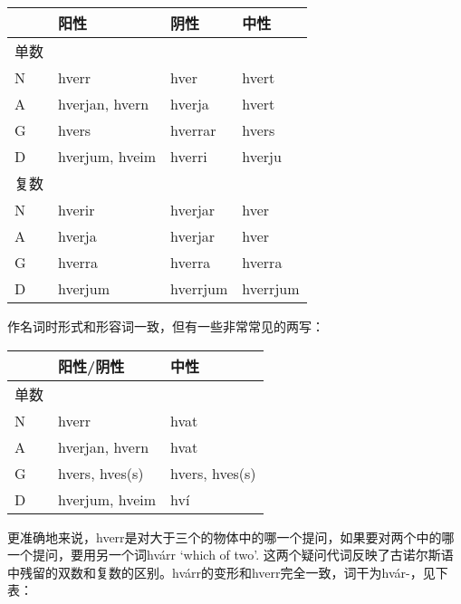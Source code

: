 \begin{introduction}[章节要点]
\begin{longtable}{llll}
    \toprule
         & 阳性           & 阴性     & 中性     \\
    \midrule
    \endhead
    \bottomrule
    \endfoot
    单数 &                &          &          \\
    N    & hverr          & hver     & hvert    \\
    A    & hverjan, hvern & hverja   & hvert    \\
    G    & hvers          & hverrar  & hvers    \\
    D    & hverjum, hveim & hverri   & hverju   \\
    复数 &                &          &          \\
    N    & hverir         & hverjar  & hver     \\
    A    & hverja         & hverjar  & hver     \\
    G    & hverra         & hverra   & hverra   \\
    D    & hverjum        & hverrjum & hverrjum \\
\end{longtable}

作名词时形式和形容词一致，但有一些非常常见的两写：

\begin{longtable}{lll}
    \toprule
         & 阳性/阴性      & 中性           \\
    \midrule
    \endhead
    \bottomrule
    \endfoot
    单数 &                &                \\
    N    & hverr          & hvat           \\
    A    & hverjan, hvern & hvat           \\
    G    & hvers, hves(s) & hvers, hves(s) \\
    D    & hverjum, hveim & hví            \\
\end{longtable}

更准确地来说，hverr是对大于三个的物体中的哪一个提问，如果要对两个中的哪一个提问，要用另一个词hvárr `which of two‌'.
这两个疑问代词反映了古诺尔斯语中残留的双数和复数的区别。hvárr的变形和hverr完全一致，词干为hvár-，见下表：


\end{introduction}
